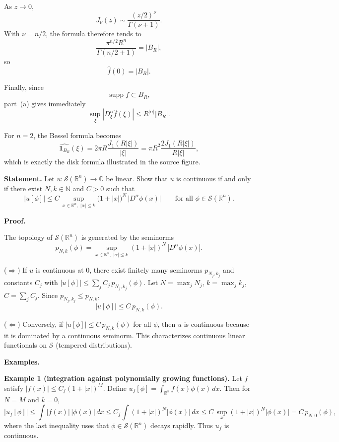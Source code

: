 \begin{solution}
As \(z\to0\),
\[
J_\nu(z)
\sim
\frac{(z/2)^\nu}{\Gamma(\nu+1)}.
\]
With \(\nu=n/2\), the formula therefore tends to
\[
\frac{\pi^{n/2}R^n}{\Gamma(n/2+1)}
=
|B_R|,
\]
so
\[
\widehat f(0)=|B_R|.
\]

Finally, since
\[
\operatorname{supp}f\subset B_R,
\]
part~(a) gives immediately
\[
\boxed{
\sup_\xi
|D_\xi^\alpha\widehat f(\xi)|
\le
R^{|\alpha|}|B_R|.}
\]

For \(n=2\), the Bessel formula becomes
\[
\widehat{\mathbf1_{B_R}}(\xi)
=
2\pi R
\frac{J_1(R|\xi|)}{|\xi|}
=
\pi R^2
\frac{2J_1(R|\xi|)}{R|\xi|},
\]
which is exactly the disk formula illustrated in the source figure.
\end{solution}


\begin{problem}[CP-III-0024]
\label{prob:cp-iii-0024}
\par\smallskip\noindent\textbf{Statement.}\quad
Let $u:\mathcal S(\mathbb R^n)\to\mathbb C$ be linear. Show that $u$ is continuous if and only if there exist $N,k\in\mathbb N$ and $C>0$ such that
\[
|u[\phi]|\le C\,\sup_{x\in\mathbb R^n,\;|\alpha|\le k}\bigl(1+|x|\bigr)^N\,\bigl|D^\alpha\phi(x)\bigr|
\qquad\text{for all }\phi\in\mathcal S(\mathbb R^n).
\]

\par\smallskip\noindent\textbf{Proof.}\quad

The topology of $\mathcal S(\mathbb R^n)$ is generated by the seminorms
\[
p_{N,k}(\phi)=\sup_{x\in\mathbb R^n,\;|\alpha|\le k} (1+|x|)^N\,|D^\alpha\phi(x)|.
\]

($\Rightarrow$) If $u$ is continuous at $0$, there exist finitely many seminorms $p_{N_j,k_j}$ and constants $C_j$ with
$|u[\phi]|\le \sum_j C_j\,p_{N_j,k_j}(\phi)$. Let $N=\max_j N_j$, $k=\max_j k_j$, $C=\sum_j C_j$. Since $p_{N_j,k_j}\le p_{N,k}$,
\[
|u[\phi]|\le C\,p_{N,k}(\phi).
\]

($\Leftarrow$) Conversely, if $|u[\phi]|\le C\,p_{N,k}(\phi)$ for all $\phi$, then $u$ is continuous because it is dominated by a continuous seminorm. This characterizes continuous linear functionals on $\mathcal S$ (tempered distributions).

\par\smallskip\noindent\textbf{Examples.}\quad

\bigskip

\textbf{Example 1 (integration against polynomially growing functions).}
Let $f$ satisfy $|f(x)|\le C_f(1+|x|)^M$. Define $u_f[\phi]=\int_{\mathbb R^n} f(x)\phi(x)\,dx$.
Then for $N=M$ and $k=0$,
\[
|u_f[\phi]|
\le \int |f(x)|\,|\phi(x)|\,dx
\le C_f \int (1+|x|)^N |\phi(x)|\,dx
\le C\, \sup_{x} (1+|x|)^N |\phi(x)|
= C\,p_{N,0}(\phi),
\]
where the last inequality uses that $\phi\in\mathcal S(\mathbb R^n)$ decays rapidly. Thus $u_f$ is continuous.


\end{problem}
